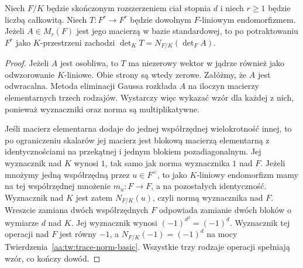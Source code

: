 \begin{lemat}
\label{aa:lem:restriction-determinant}
Niech $F/K$ będzie skończonym rozszerzeniem ciał stopnia $d$
i niech $r\ge1$ będzie liczbą całkowitą.
Niech $T:F^r\to F^r$ będzie dowolnym $F$-liniowym endomorfizmem.
Jeżeli $A\in M_r(F)$ jest jego macierzą w bazie standardowej,
to po potraktowaniu $F^r$ jako $K$-przestrzeni zachodzi
$\det_K T=N_{F/K}(\det_F A)$.
\end{lemat}
\begin{proof}
Jeżeli $A$ jest osobliwa, to $T$ ma niezerowy wektor
w jądrze również jako odwzorowanie $K$-liniowe.
Obie strony są wtedy zerowe.
Załóżmy, że $A$ jest odwracalna. Metoda eliminacji Gaussa
rozkłada $A$ na iloczyn macierzy elementarnych trzech rodzajów.
Wystarczy więc wykazać wzór dla każdej z nich,
ponieważ wyznaczniki oraz norma są multiplikatywne.

Jeśli macierz elementarna dodaje do jednej współrzędnej
wielokrotność innej, to po ograniczeniu skalarów
jej macierz jest blokową macierzą elementarną
z identycznościami na przekątnej i jednym blokiem
pozadiagonalnym. Jej wyznacznik nad $K$ wynosi $1$,
tak samo jak norma wyznacznika $1$ nad $F$.
Jeżeli mnożymy jedną współrzędną przez $u\in F^\times$,
to jako $K$-liniowy endomorfizm mamy na tej współrzędnej
mnożenie $m_u:F\to F$, a na pozostałych identyczność.
Wyznacznik nad $K$ jest zatem $N_{F/K}(u)$,
czyli normą wyznacznika nad $F$.
Wreszcie zamiana dwóch współrzędnych $F$ odpowiada
zamianie dwóch bloków o wymiarze $d$ nad $K$.
Jej wyznacznik wynosi $(-1)^{d^2}=(-1)^d$.
Wyznacznik tej operacji nad $F$ jest równy $-1$,
a $N_{F/K}(-1)=(-1)^d$ na mocy
Twierdzenia~\ref{aa:tw:trace-norm-basic}.
Wszystkie trzy rodzaje operacji spełniają wzór,
co kończy dowód.
\end{proof}

